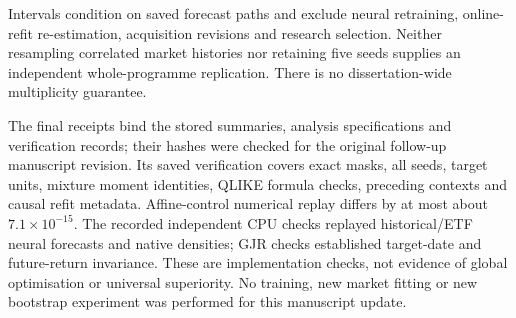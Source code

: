 Intervals condition on saved forecast paths and exclude neural retraining, online-refit re-estimation, acquisition revisions and research selection. Neither resampling correlated market histories nor retaining five seeds supplies an independent whole-programme replication. There is no dissertation-wide multiplicity guarantee.

The final receipts bind the stored summaries, analysis specifications and verification records; their hashes were checked for the original follow-up manuscript revision. Its saved verification covers exact masks, all seeds, target units, mixture moment identities, QLIKE formula checks, preceding contexts and causal refit metadata. Affine-control numerical replay differs by at most about $7.1\times10^{-15}$. The recorded independent CPU checks replayed historical/ETF neural forecasts and native densities; GJR checks established target-date and future-return invariance. These are implementation checks, not evidence of global optimisation or universal superiority. No training, new market fitting or new bootstrap experiment was performed for this manuscript update.
